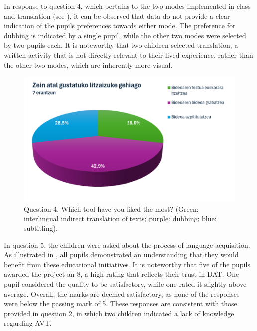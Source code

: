 In response to question 4, which pertains to the two modes implemented
in class and translation (see ), it can be observed that data do
not provide a clear indication of the pupils\textquotesingle{}
preferences towards either mode. The preference for dubbing is indicated
by a single pupil, while the other two modes were selected by two pupils
each. It is noteworthy that two children selected translation, a written
activity that is not directly relevant to their lived experience, rather
than the other two modes, which are inherently more visual.

\begin{figure}[!htbp]
    \centering
    \begin{minipage}{.6\textwidth}
    \includegraphics[width=\textwidth]{fig04.png}
    \caption{Question 4. Which tool have you liked the most?
    (Green: interlingual indirect translation of texts; purple: dubbing;
    blue: subtitling).}
    \label{fig-04}
    \end{minipage}
\end{figure}


In question 5, the children were asked about the process of language
acquisition. As illustrated in , all pupils demonstrated an
understanding that they would benefit from these educational
initiatives. It is noteworthy that five of the pupils awarded the
project an 8, a high rating that reflects their trust in DAT. One pupil
considered the quality to be satisfactory, while one rated it slightly
above average. Overall, the marks are deemed satisfactory, as none of
the responses were below the passing mark of 5. These responses are
consistent with those provided in question 2, in which two children
indicated a lack of knowledge regarding AVT.

